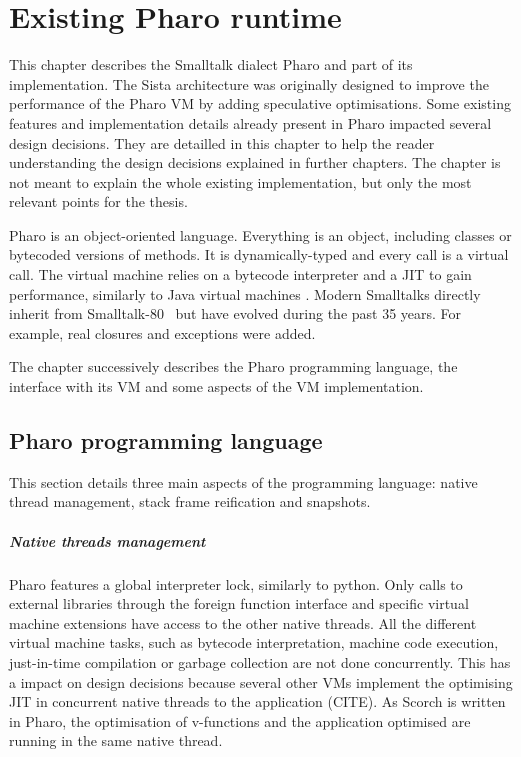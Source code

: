 \documentclass[a4paper,12pt,twoside]{../includes/ThesisStyle}
\begin{document}
\fi

\chapter{Existing Pharo runtime}
\label{chap:existing}
\minitoc

This chapter describes the Smalltalk dialect Pharo and part of its implementation. The Sista architecture was originally designed to improve the performance of the Pharo VM by adding speculative optimisations. Some existing features and implementation details already present in Pharo impacted several design decisions. They are detailled in this chapter to help the reader understanding the design decisions explained in further chapters. The chapter is not meant to explain the whole existing implementation, but only the most relevant points for the thesis. 

Pharo is an object-oriented language. Everything is an object, including classes or bytecoded versions of methods. It is dynamically-typed and every call is a virtual call. The virtual machine relies on a bytecode interpreter and a JIT to gain performance, similarly to Java virtual machines \cite{JavaVM8}. Modern Smalltalks directly inherit from Smalltalk-80~\cite{Gold83a} but have evolved during the past 35 years. For example, real closures and exceptions were added.

The chapter successively describes the Pharo programming language, the interface with its VM and some aspects of the VM implementation.

\section{Pharo programming language}

This section details three main aspects of the programming language: native thread management, stack frame reification and snapshots.

\paragraph{Native threads management}

Pharo features a global interpreter lock, similarly to python. Only calls to external libraries through the foreign function interface and specific virtual machine extensions have access to the other native threads. All the different virtual machine tasks, such as bytecode interpretation, machine code execution, just-in-time compilation or garbage collection are not done concurrently. This has a impact on design decisions because several other VMs implement the optimising JIT in concurrent native threads to the application (CITE). As Scorch is written in Pharo, the optimisation of v-functions and the application optimised are running in the same native thread.
\end{document}
